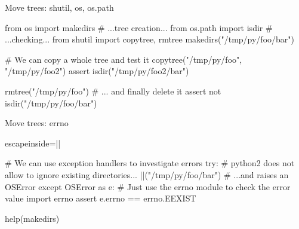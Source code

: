 \begin{pyframe}{Move trees: shutil, os, os.path}
\begin{pycode}
from os import makedirs     # ...tree creation...
from os.path import isdir   # ...checking...         
from shutil import copytree, rmtree 
makedirs("/tmp/py/foo/bar")

# We can copy a whole tree and test it
copytree("/tmp/py/foo", "/tmp/py/foo2") 
assert isdir("/tmp/py/foo2/bar")            

rmtree("/tmp/py/foo") # ... and finally delete it
assert not isdir("/tmp/py/foo/bar")
\end{pycode}
\end{pyframe}

\begin{pyframe}{Move trees: errno}
\begin{pycode*}{escapeinside=||}

# We can use exception handlers to investigate errors
try:
    # python2 does not allow to ignore existing directories...
    ||("/tmp/py/foo/bar") 
    #  ...and raises an OSError
except OSError as e:
    # Just use the errno module to check the error value
    import errno
    assert e.errno == errno.EEXIST
    
help(makedirs)
\end{pycode*}
\end{pyframe}

